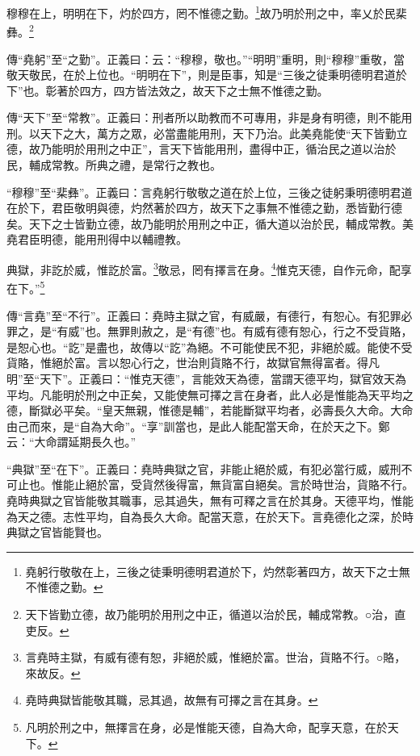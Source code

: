 穆穆在上，明明在下，灼於四方，罔不惟德之勤。\footnote{堯躬行敬敬在上，三後之徒秉明德明君道於下，灼然彰著四方，故天下之士無不惟德之勤。}故乃明於刑之中，率乂於民棐彝。\footnote{天下皆勤立德，故乃能明於用刑之中正，循道以治於民，輔成常教。○治，直吏反。}


{\noindent\zhuan{}\fzbyks 傳“堯躬”至“之勤”。正義曰：云：“穆穆，敬也。”“明明”重明，則“穆穆”重敬，當敬天敬民，在於上位也。“明明在下”，則是臣事，知是“三後之徒秉明德明君道於下”也。彰著於四方，四方皆法效之，故天下之士無不惟德之勤。 \par}

{\noindent\zhuan{}\fzbyks 傳“天下”至“常教”。正義曰：刑者所以助教而不可專用，非是身有明德，則不能用刑。以天下之大，萬方之眾，必當盡能用刑，天下乃治。此美堯能使“天下皆勤立德，故乃能明於用刑之中正”，言天下皆能用刑，盡得中正，循治民之道以治於民，輔成常教。所典之禮，是常行之教也。 \par}

{\noindent\shu{}\fzkt “穆穆”至“棐彝”。正義曰：言堯躬行敬敬之道在於上位，三後之徒躬秉明德明君道在於下，君臣敬明與德，灼然著於四方，故天下之事無不惟德之勤，悉皆勤行德矣。天下之士皆勤立德，故乃能明於用刑之中正，循大道以治於民，輔成常教。美堯君臣明德，能用刑得中以輔禮教。 \par}

典獄，非訖於威，惟訖於富。\footnote{言堯時主獄，有威有德有恕，非絕於威，惟絕於富。世治，貨賂不行。○賂，來故反。}敬忌，罔有擇言在身。\footnote{堯時典獄皆能敬其職，忌其過，故無有可擇之言在其身。}惟克天德，自作元命，配享在下。”\footnote{凡明於刑之中，無擇言在身，必是惟能天德，自為大命，配享天意，在於天下。}


{\noindent\zhuan{}\fzbyks 傳“言堯”至“不行”。正義曰：堯時主獄之官，有威嚴，有德行，有恕心。有犯罪必罪之，是“有威”也。無罪則赦之，是“有德”也。有威有德有恕心，行之不受貨賂，是恕心也。“訖”是盡也，故傳以“訖”為絕。不可能使民不犯，非絕於威。能使不受貨賂，惟絕於富。言以恕心行之，世治則貨賂不行，故獄官無得富者。得凡明”至“天下”。正義曰：“惟克天德”，言能效天為德，當謂天德平均，獄官效天為平均。凡能明於刑之中正矣，又能使無可擇之言在身者，此人必是惟能為天平均之德，斷獄必平矣。“皇天無親，惟德是輔”，若能斷獄平均者，必壽長久大命。大命由己而來，是“自為大命”。“享”訓當也，是此人能配當天命，在於天之下。鄭云：“大命謂延期長久也。” \par}

{\noindent\shu{}\fzkt “典獄”至“在下”。正義曰：堯時典獄之官，非能止絕於威，有犯必當行威，威刑不可止也。惟能止絕於富，受貨然後得富，無貨富自絕矣。言於時世治，貨賂不行。堯時典獄之官皆能敬其職事，忌其過失，無有可釋之言在於其身。天德平均，惟能為天之德。志性平均，自為長久大命。配當天意，在於天下。言堯德化之深，於時典獄之官皆能賢也。 \par}

